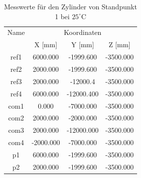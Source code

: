 \begin{table}[h]\label{tab:zylinderausd1}
\centering
\caption{Messwerte für den Zylinder von Standpunkt 1 bei $25^\circ\text{C}$}

\begin{tabular}{cccc}
\toprule
\multicolumn{1}{c|}{Name} &
\multicolumn{3}{c}{Koordinaten} \\
\multicolumn{1}{c|}{} &
\multicolumn{1}{c|}{X [mm]} &
\multicolumn{1}{c|}{Y [mm]} &
\multicolumn{1}{c}{Z [mm]} \\
\midrule

\multicolumn{1}{c|}{ref1} &
\multicolumn{1}{c|}{6000.000} &
\multicolumn{1}{c|}{-1999.600} &
\multicolumn{1}{c}{-3500.000} \\

\multicolumn{1}{c|}{ref2} &
\multicolumn{1}{c|}{2000.000} &
\multicolumn{1}{c|}{-1999.600} &
\multicolumn{1}{c}{-3500.000} \\

\multicolumn{1}{c|}{ref3} &
\multicolumn{1}{c|}{2000.000} &
\multicolumn{1}{c|}{-12000.4} &
\multicolumn{1}{c}{-3500.000} \\

\multicolumn{1}{c|}{ref4} &
\multicolumn{1}{c|}{6000.000} &
\multicolumn{1}{c|}{-12000.400} &
\multicolumn{1}{c}{-3500.000} \\

\multicolumn{1}{c|}{com1} &
\multicolumn{1}{c|}{0.000} &
\multicolumn{1}{c|}{-7000.000} &
\multicolumn{1}{c}{-3500.000} \\

\multicolumn{1}{c|}{com2} &
\multicolumn{1}{c|}{2000.000} &
\multicolumn{1}{c|}{-2000.000} &
\multicolumn{1}{c}{-3500.000} \\

\multicolumn{1}{c|}{com3} &
\multicolumn{1}{c|}{2000.000} &
\multicolumn{1}{c|}{-12000.000} &
\multicolumn{1}{c}{-3500.000} \\

\multicolumn{1}{c|}{com4} &
\multicolumn{1}{c|}{-2000.000} &
\multicolumn{1}{c|}{-7000.000} &
\multicolumn{1}{c}{-3500.000} \\

\multicolumn{1}{c|}{p1} &
\multicolumn{1}{c|}{6000.000} &
\multicolumn{1}{c|}{-1999.600} &
\multicolumn{1}{c}{-3500.000} \\

\multicolumn{1}{c|}{p2} &
\multicolumn{1}{c|}{2000.000} &
\multicolumn{1}{c|}{-1999.600} &
\multicolumn{1}{c}{-3500.000} \\


\end{tabular}
\end{table}
